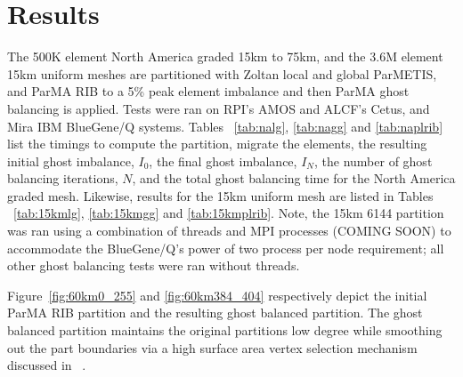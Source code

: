 \documentclass[a4paper]{article}
\begin{document}
\section{Results}

The 500K element North America graded 15km to 75km, and the 3.6M element 15km uniform meshes are partitioned with Zoltan local and global ParMETIS, and ParMA RIB to a 5\% peak element imbalance and then ParMA ghost balancing is applied. 
Tests were ran on RPI's AMOS and ALCF's Cetus, and Mira IBM BlueGene/Q systems.  
Tables ~\ref{tab:nalg}, \ref{tab:nagg} and \ref{tab:naplrib} list the timings to compute the partition, migrate the elements, the resulting initial ghost imbalance, $I_0$, the final ghost imbalance, $I_N$, the number of ghost balancing iterations, $N$, and the total ghost balancing time for the North America graded mesh.
Likewise, results for the 15km uniform mesh are listed in Tables ~\ref{tab:15kmlg}, \ref{tab:15kmgg} and \ref{tab:15kmplrib}.  
Note, the 15km 6144 partition was ran using a combination of threads and MPI processes (COMING SOON) to accommodate the BlueGene/Q's power of two process per node requirement; all other ghost balancing tests were ran without threads.

Figure~\ref{fig:60km0_255} and \ref{fig:60km384_404} respectively depict the initial ParMA RIB partition and the resulting ghost balanced partition.  
The ghost balanced partition maintains the original partitions low degree while smoothing out the part boundaries via a high surface area vertex selection mechanism discussed in ~\cite{ParMA-2014}.
\end{document}
